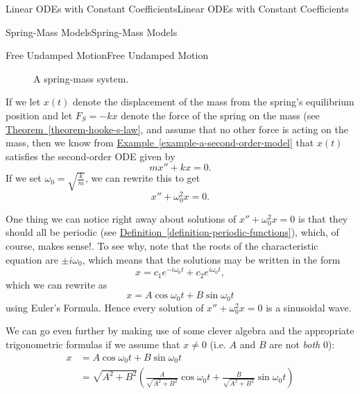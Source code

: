 \documentclass[10pt,]{book}
\numberwithin{equation}{section}
\newcommand{\amp}{&}
\begin{document}
\begin{chapterptx}{Linear ODEs with Constant Coefficients}{}{Linear ODEs with Constant Coefficients}{}{}
\begin{sectionptx}{Spring-Mass Models}{}{Spring-Mass Models}{}{}
\begin{subsectionptx}{Free Undamped Motion}{}{Free Undamped Motion}{}{}
\begin{figure}
{
}
\caption{A spring-mass system.\label{figure-spring-mass-system}}
\end{figure}
\hypertarget{p-200}{}%
If we let \(x(t)\) denote the displacement of the mass from the spring's equilibrium position and let \(F_{S} = -kx\) denote the force of the spring on the mass (see \hyperref[theorem-hooke-s-law]{Theorem~\ref{theorem-hooke-s-law}}, and assume that no other force is acting on the mass, then we know from \hyperref[example-a-second-order-model]{Example~\ref{example-a-second-order-model}} that \(x(t)\) satisfies the second-order ODE given by%
\begin{equation*}
mx'' + kx = 0.
\end{equation*}
If we set \(\omega_{0} = \sqrt{\frac{k}{m}}\), we can rewrite this to get%
\begin{equation*}
x'' + \omega_{0}^{2}x = 0.
\end{equation*}
%
\par
\hypertarget{p-201}{}%
One thing we can notice right away about solutions of \(x''+\omega_{0}^{2}x = 0\) is that they should all be periodic (see \hyperref[definition-periodic-functions]{Definition~\ref{definition-periodic-functions}}), which, of course, makes sense!. To see why, note that the roots of the characteristic equation are \(\pm i\omega_{0}\), which means that the solutions may be written in the form%
\begin{equation*}
x = c_{1}e^{-i\omega_{0}t} + c_{2}e^{i\omega_{0}t},
\end{equation*}
which we can rewrite as%
\begin{equation*}
x = A\cos\omega_{0}t + B\sin\omega_{0}t
\end{equation*}
using Euler's Formula. Hence every solution of \(x''+\omega_{0}^{2}x = 0\) is a sinusoidal wave.%
\par
\hypertarget{p-202}{}%
We can go even further by making use of some clever algebra and the appropriate trigonometric formulas if we assume that \(x\neq0\) (i.e. \(A\) and \(B\) are not \emph{both} \(0\)):%
\begin{align*}
x \amp = A\cos\omega_{0}t + B\sin\omega_{0}t \\
\amp = \sqrt{A^{2}+B^{2}}\left(\frac{A}{\sqrt{A^{2}+B^{2}}}\cos\omega_{0}t + \frac{B}{\sqrt{A^{2} + B^{2}}}\sin\omega_{0}t\right) 

\end{align*}
\end{subsectionptx}
\end{sectionptx}
\end{chapterptx}
\end{document}
